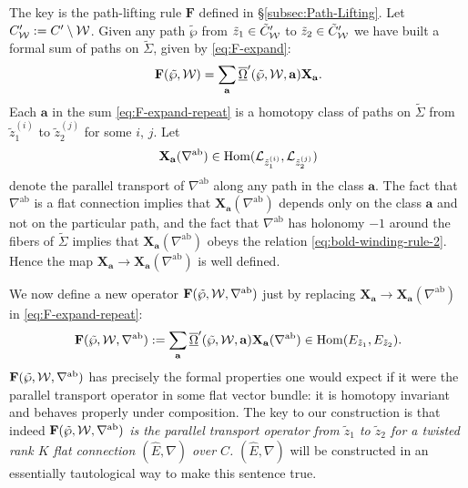 \documentclass[11pt,a4paper]{article}
\def\CL {{\cal L}}
\def\wnet {{\cal W}}
\def\ab{{\mathrm{ab}}}
\def\tz{{\tilde z}}
\def\ba{\mathbf{a}}
\def\bF{\mathbf{F}}
\def\bX{\mathbf{X}}
\newcommand{\ti}[1]{\textit{#1}}
\def\CL {{\cal L}}
\def\wnet {{\cal W}}
\newcommand\fro{{\overline{\underline{\Omega}}}}
\DeclareMathOperator{\Hom}{{Hom}}
\begin{document}
The key is the path-lifting rule $\bF$ defined in \S \ref{subsec:Path-Lifting}.
Let $C'_\wnet := C' \setminus \wnet$.
Given any path $\tilde \wp$ from $\tz_1 \in \tilde C'_\wnet$ to $\tz_2 \in \tilde C'_\wnet$
we have built a formal sum of paths on $\tilde\Sigma$, given by \eqref{eq:F-expand}:
\begin{equation} \label{eq:F-expand-repeat}
 \bF(\tilde \wp, \wnet) = \sum_{\ba} \fro'(\tilde \wp, \wnet, \ba) \bX_{\ba}.
\end{equation}
Each $\ba$ in the sum \eqref{eq:F-expand-repeat}
is a homotopy class of paths on $\tilde\Sigma$ from $\tz_1^{(i)}$
to $\tz_2^{(j)}$ for some $i$, $j$.
Let
\begin{equation}
\bX_\ba(\nabla^\ab) \in \Hom(\CL_{\tz_1^{(i)}}, \CL_{\tz_2^{(j)}})
\end{equation}
denote the parallel transport of $\nabla^\ab$ along any path in the class $\ba$.
The fact that $\nabla^\ab$ is a flat connection implies that $\bX_\ba(\nabla^\ab)$ depends
only on the class $\ba$
and not on the particular path, and the fact that $\nabla^\ab$ has holonomy $-1$
around the fibers of $\tilde \Sigma$ implies that $\bX_\ba(\nabla^\ab)$
obeys the relation \eqref{eq:bold-winding-rule-2}.
Hence the map $\bX_\ba \to \bX_\ba(\nabla^\ab)$ is well defined.

We now define a
new operator $\bF(\tilde \wp, \wnet, \nabla^\ab)$
just by replacing $\bX_\ba \to \bX_\ba(\nabla^\ab)$
in \eqref{eq:F-expand-repeat}:
\begin{equation} \label{eq:pt-exp}
 \bF(\tilde \wp, \wnet, \nabla^\ab) := \sum_{\ba} \fro'(\tilde \wp, \wnet, \ba) \bX_\ba(\nabla^\ab) \in \Hom(E_{\tz_1}, E_{\tz_2}).
\end{equation}
$\bF(\tilde \wp, \wnet, \nabla^\ab)$ has precisely
the formal properties one would expect
if it were the parallel transport operator in some flat vector bundle:  it is homotopy invariant
and behaves properly under composition.
The key to our construction is that indeed
\ti{$\bF(\tilde \wp, \wnet, \nabla^\ab)$ is the parallel
transport operator from $\tz_1$ to $\tz_2$ for a twisted rank $K$
flat connection $({\hat E}, \nabla)$ over $C$.}
$({\hat E}, \nabla)$ will be constructed in an essentially
tautological way to make this sentence true.
\end{document}

